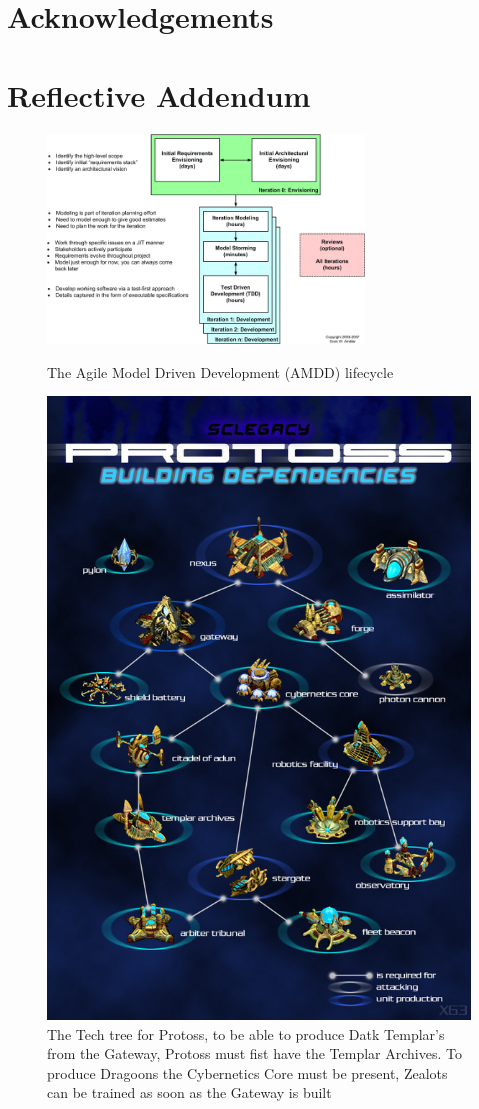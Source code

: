 \documentclass[journal]{IEEEtran}
\begin{document}
\section{Acknowledgements}





\section{Reflective Addendum}

\appendix
\begin{figure}
	\centering
	\includegraphics[width=0.75\textwidth]{AMDD}
	\centering\caption{The Agile Model Driven Development (AMDD) lifecycle \cite{AMDD}}
	\label{Fig10}
	\centering
	\includegraphics[width= 0.5 \textwidth]{ProtossTechTree}
	\centering\caption{The Tech tree for Protoss, to be able to produce Datk Templar's from the Gateway, Protoss must fist have the Templar Archives. To produce Dragoons the Cybernetics Core must be present, Zealots can be trained as soon as the Gateway is built \cite{Tech}}
	\label{Fig11}
\end{figure}
\end{document}
